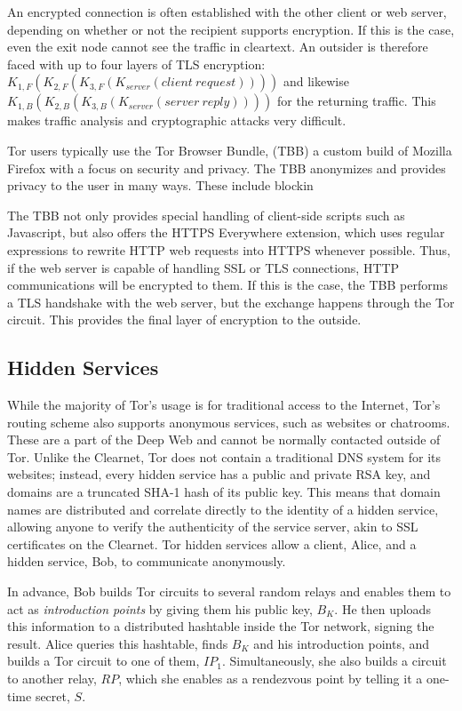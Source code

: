 An encrypted connection is often established with the other client or web server, depending on whether or not the recipient supports encryption. If this is the case, even the exit node cannot see the traffic in cleartext. An outsider is therefore faced with up to four layers of TLS encryption: $K_{1,F}(K_{2,F}(K_{3,F}(K_{server}(client\ request))))$ and likewise $K_{1,B}(K_{2,B}(K_{3,B}(K_{server}(server\ reply))))$ for the returning traffic. This makes traffic analysis and cryptographic attacks very difficult.

Tor users typically use the Tor Browser Bundle, (TBB) a custom build of Mozilla Firefox with a focus on security and privacy. The TBB anonymizes and provides privacy to the user in many ways. These include blockin 

The TBB not only provides special handling of client-side scripts such as Javascript, but also offers the HTTPS Everywhere extension, which uses regular expressions to rewrite HTTP web requests into HTTPS whenever possible. Thus, if the web server is capable of handling SSL or TLS connections, HTTP communications will be encrypted to them. If this is the case, the TBB performs a TLS handshake with the web server, but the exchange happens through the Tor circuit. This provides the final layer of encryption to the outside.

\subsection{Hidden Services}

While the majority of Tor's usage is for traditional access to the Internet, Tor's routing scheme also supports anonymous services, such as websites or chatrooms. These are a part of the Deep Web and cannot be normally contacted outside of Tor. Unlike the Clearnet, Tor does not contain a traditional DNS system for its websites; instead, every hidden service has a public and private RSA key, and domains are a truncated SHA-1 hash of its public key. This means that domain names are distributed and correlate directly to the identity of a hidden service, allowing anyone to verify the authenticity of the service server, akin to SSL certificates on the Clearnet. Tor hidden services allow a client, Alice, and a hidden service, Bob, to communicate anonymously.\cite{TorOverview}

In advance, Bob builds Tor circuits to several random relays and enables them to act as \textit{introduction points} by giving them his public key, $B_{K}$. He then uploads this information to a distributed hashtable inside the Tor network, signing the result. Alice queries this hashtable, finds $B_{K}$ and his introduction points, and builds a Tor circuit to one of them, $IP_{1}$. Simultaneously, she also builds a circuit to another relay, $RP$, which she enables as a rendezvous point by telling it a one-time secret, $S$. 

